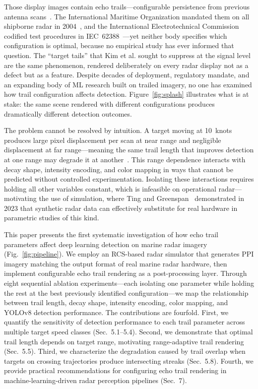 \documentclass[colorlinks,upint,balance]{asmeconf}
\begin{document}
Those display images contain echo trails---configurable persistence from previous antenna scans~\cite{Briggs2004RadarDisplay}. The International Maritime Organization mandated them on all shipborne radar in 2004~\cite{IMO2004MSC192}, and the International Electrotechnical Commission codified test procedures in IEC~62388~\cite{IEC2013Radar}---yet neither body specifies which configuration is optimal, because no empirical study has ever informed that question. The ``target tails'' that Kim et al. sought to suppress at the signal level are the same phenomenon, rendered deliberately on every radar display not as a defect but as a feature. Despite decades of deployment, regulatory mandate, and an expanding body of ML research built on trailed imagery, no one has examined how trail configuration affects detection. Figure~\ref{fig:splash} illustrates what is at stake: the same scene rendered with different configurations produces dramatically different detection outcomes.

The problem cannot be resolved by intuition. A target moving at 10~knots produces large pixel displacement per scan at near range and negligible displacement at far range---meaning the same trail length that improves detection at one range may degrade it at another~\cite{Chen2022VisibilityGraph}. This range dependence interacts with decay shape, intensity encoding, and color mapping in ways that cannot be predicted without controlled experimentation. Isolating these interactions requires holding all other variables constant, which is infeasible on operational radar---motivating the use of simulation, where Ting and Greenspan~\cite{Ting2023SyntheticRadar} demonstrated in 2023 that synthetic radar data can effectively substitute for real hardware in parametric studies of this kind.

This paper presents the first systematic investigation of how echo trail parameters affect deep learning detection on marine radar imagery (Fig.~\ref{fig:pipeline}). We employ an RCS-based radar simulator that generates PPI imagery matching the output format of real marine radar hardware, then implement configurable echo trail rendering as a post-processing layer. Through eight sequential ablation experiments---each isolating one parameter while holding the rest at the best previously identified configuration---we map the relationship between trail length, decay shape, intensity encoding, color mapping, and YOLOv8 detection performance. The contributions are fourfold. First, we quantify the sensitivity of detection performance to each trail parameter across multiple target speed classes (Sec.~5.1--5.4). Second, we demonstrate that optimal trail length depends on target range, motivating range-adaptive trail rendering (Sec.~5.5). Third, we characterize the degradation caused by trail overlap when targets on crossing trajectories produce intersecting streaks (Sec.~5.8). Fourth, we provide practical recommendations for configuring echo trail rendering in machine-learning-driven radar perception pipelines (Sec.~7).
\end{document}
